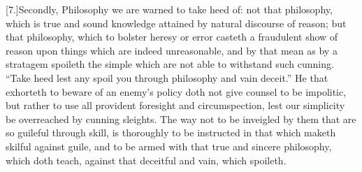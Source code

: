 [7.]Secondly, Philosophy we are warned to take heed of: not that philosophy, which is true and sound knowledge attained by natural discourse of reason; but that philosophy, which to bolster heresy or error casteth a fraudulent show of reason upon things which are indeed unreasonable, and by that mean as by a stratagem spoileth the simple which are not able to withstand such cunning. “Take heed lest any spoil you through philosophy and vain deceit.” He that exhorteth to beware of an enemy’s policy doth not give  counsel to be impolitic, but rather to use all provident foresight and circumspection, lest our simplicity be overreached by cunning sleights. The way not to be inveigled by them that are so guileful through skill, is thoroughly to be instructed in that which maketh skilful against guile, and to be armed with that true and sincere philosophy, which doth teach, against that deceitful and vain, which spoileth.

